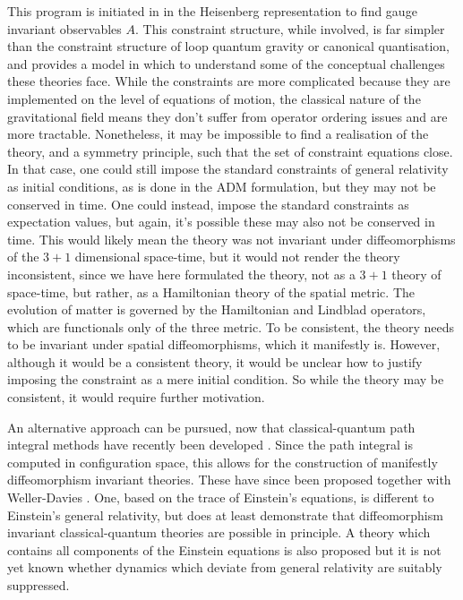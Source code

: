 \documentclass[aps,pra,showpacs,citeautoscript,amsmath,amssymb,floatfix,superscriptaddress,bbm, verbatim,amsfonts,changes,11pt,nofootinbib,longbibliography]{revtex4-2}
\begin{document}
This program is initiated in  \cite{UCL2022constraints} in the Heisenberg representation to find gauge invariant observables $A$.
This constraint structure, while involved, is far simpler than the constraint structure of loop quantum gravity or canonical quantisation, and provides a model in which to understand some of the conceptual challenges these theories face.
While the constraints are more complicated because they are implemented on the level of equations of motion, the classical nature of the gravitational field means they don't suffer from operator ordering issues and are more tractable. Nonetheless, it may be  impossible to find a realisation of the theory, and a symmetry principle, such that the set of constraint equations close. In that case, one could still impose the standard constraints of general relativity as initial conditions, as is done in the ADM formulation, but they may not be conserved in time. One could instead, impose the standard constraints as expectation values, but again, it's possible these may also not be conserved in time. This would likely mean the theory was not invariant under diffeomorphisms of the $3+1$ dimensional space-time, but it would not render the theory inconsistent, since we have here formulated the theory, not as a $3+1$ theory of space-time, but rather, 
 as a Hamiltonian theory of the spatial metric. The evolution of matter is governed by the Hamiltonian and Lindblad operators, which are functionals only of the three metric. To be consistent, the theory needs to be invariant under spatial diffeomorphisms, which it manifestly is. However, although it would be a consistent theory, it would be unclear how to justify imposing the constraint as a mere initial condition. So while the theory may be consistent, it would require further motivation. 
 
 An alternative approach can  be pursued, now that classical-quantum path integral methods have recently been developed \cite{oppenheim2023path}.  Since the path integral is computed in configuration space, this allows for the construction of manifestly diffeomorphism invariant theories. These have since been proposed together with Weller-Davies \cite{oppenheim2023covariant}. One, based on the trace of Einstein's equations, is different to Einstein's general relativity, but does at least demonstrate that diffeomorphism invariant classical-quantum theories are possible in principle. A theory which contains all components of the Einstein equations is also proposed but it is not yet known whether dynamics which deviate from general relativity are suitably suppressed. 
\end{document}
